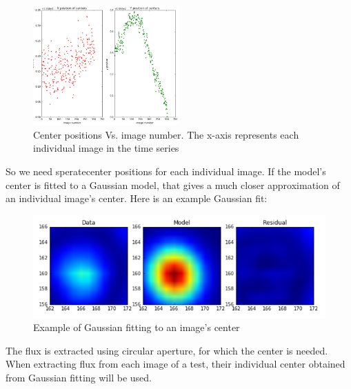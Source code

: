 \documentclass[conference]{IEEEtran}
\begin{document}
        \begin{figure}[H]
            \includegraphics[width=0.5\textwidth]{center_positions}
            \caption{Center positions Vs. image number. The x-axis represents each individual image in the time series}
        \end{figure}
        
        So we need speratecenter positions for each individual image. If the model's center is fitted to a Gaussian model, that gives a much closer approximation of an individual image's center. Here is an example Gaussian fit:
        
        \begin{figure}[H]
            \includegraphics[scale=0.5]{Gaussian}
            \caption{Example of Gaussian fitting to an image's center}
        \end{figure}
        The flux is extracted using circular aperture, for which the center is needed. When extracting flux from each image of a test, their individual center obtained from Gaussian fitting will be used.  
        
\end{document}
